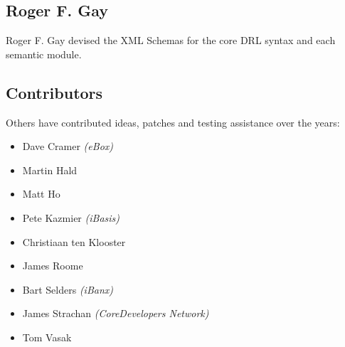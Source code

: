 \subsection{Roger F. Gay}

Roger F. Gay devised the XML Schemas for the core DRL syntax and
each semantic module.

\subsection{Contributors}

Others have contributed ideas, patches and testing assistance
over the years:

\begin{itemize}
  \item Dave Cramer \emph{(eBox)}
  \item Martin Hald
  \item Matt Ho
  \item Pete Kazmier \emph{(iBasis)}
  \item Christiaan ten Klooster
  \item James Roome
  \item Bart Selders \emph{(iBanx)}
  \item James Strachan \emph{(CoreDevelopers Network)}
  \item Tom Vasak
\end{itemize}

